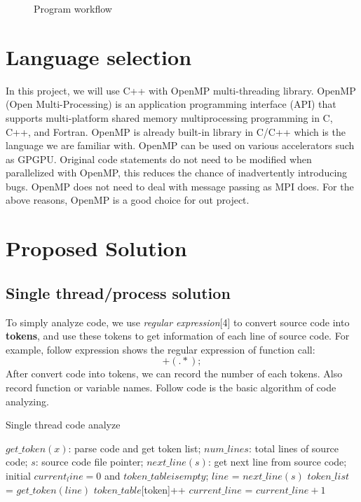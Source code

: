 \documentclass{acm_proc_article-sp}
\begin{document}
\begin{figure}
	\centering
	\caption{Program workflow}
\end{figure}

\section{Language selection}
	In this project, we will use C++ with OpenMP multi-threading library.
	OpenMP (Open Multi-Processing) is an application programming interface 
	(API) that supports multi-platform shared memory multiprocessing 
	programming in C, C++, and Fortran. OpenMP is already built-in library in 
	C/C++ which is the language we are familiar with. OpenMP can be used on 
	various accelerators such as GPGPU. Original code statements do not 
	need to be modified when parallelized with OpenMP, this reduces the chance 
	of inadvertently introducing bugs. OpenMP does not need to deal with message 
	passing as MPI does. For the above reasons, OpenMP is a good choice for 
	out project.
	
\section{Proposed Solution}
\subsection{Single thread/process solution}
	To simply analyze code, we use \textit{regular expression}[4] to convert source
	code into \textbf{tokens}, and use these tokens to get information of each line
	of source code. For example, follow expression shows the regular expression of function call: 
	\begin{displaymath}
		[a-zA-Z_][a-zA-Z0-9_]+(.*);
	\end{displaymath}
	After convert code into tokens, we can record the number of each tokens. Also
	record function or variable names.
	Follow code is the basic algorithm of code analyzing.
	\begin{algorithm}[h]
		\caption{Single thread code analyze}
		\begin{algorithmic}[1]
			\Require
				$get\_token(x)$: parse code and get token list;
				$num\_lines$: total lines of source code;
				$s$: source code file pointer;
				$next\_line(s)$: get next line from source code;
			\State initial $current_line=0$ and $token\_table is empty$;
			\Repeat
				\State $line$ = $next\_line(s)$
				\State $token\_list$ = $get\_token(line)$
					\State $token\_table[$token]++
				\EndFor
				\State $current\_line$ = $current\_line + 1$
		\end{algorithmic}
	\end{algorithm}
\end{document}
